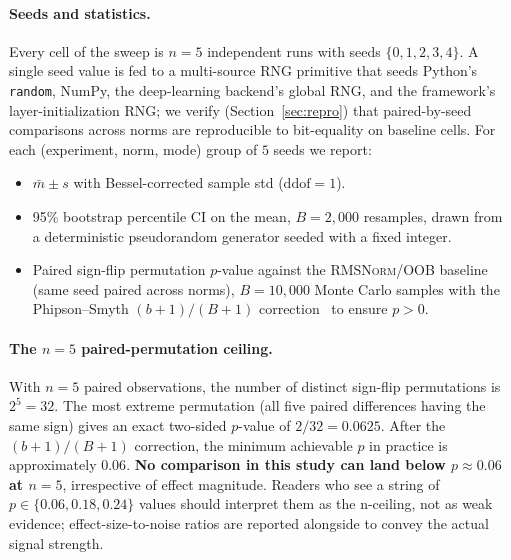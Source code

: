 \documentclass{article}
\newcommand{\rms}{\textsc{RMSNorm}}
\begin{document}
\paragraph{Seeds and statistics.}
Every cell of the sweep is $n{=}5$ independent runs with seeds $\{0,1,2,3,4\}$.
A single seed value is fed to a multi-source RNG primitive that seeds Python's \texttt{random}, NumPy, the deep-learning backend's global RNG, and the framework's layer-initialization RNG; we verify (Section~\ref{sec:repro}) that paired-by-seed comparisons across norms are reproducible to bit-equality on baseline cells.
For each (experiment, norm, mode) group of $5$ seeds we report:
\begin{itemize}
  \item $\bar m \pm s$ with Bessel-corrected sample std ($\text{ddof} = 1$).
  \item 95\% bootstrap percentile CI on the mean, $B = 2{,}000$ resamples, drawn from a deterministic pseudorandom generator seeded with a fixed integer.
  \item Paired sign-flip permutation $p$-value against the \rms{}/OOB baseline (same seed paired across norms), $B = 10{,}000$ Monte Carlo samples with the Phipson--Smyth $(b+1)/(B+1)$ correction~\citep{phipson2010permutation} to ensure $p > 0$.
\end{itemize}

\paragraph{The $n{=}5$ paired-permutation ceiling.}
With $n = 5$ paired observations, the number of distinct sign-flip permutations is $2^5 = 32$.
The most extreme permutation (all five paired differences having the same sign) gives an exact two-sided $p$-value of $2/32 = 0.0625$.
After the $(b+1)/(B+1)$ correction, the minimum achievable $p$ in practice is approximately $0.06$.
\textbf{No comparison in this study can land below $p \approx 0.06$ at $n = 5$}, irrespective of effect magnitude.
Readers who see a string of $p \in \{0.06, 0.18, 0.24\}$ values should interpret them as the n-ceiling, not as weak evidence; effect-size-to-noise ratios are reported alongside to convey the actual signal strength.
\end{document}
